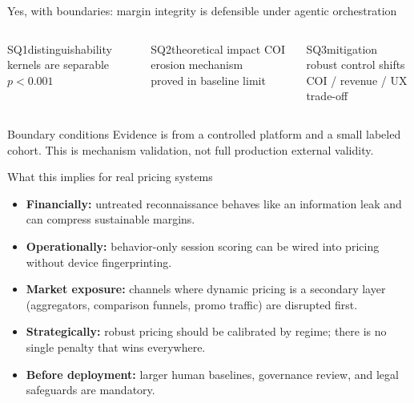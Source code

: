 \documentclass[aspectratio=169,11pt]{beamer}
\begin{document}
\begin{frame}{Yes, with boundaries: margin integrity \alert{is defensible} under agentic orchestration}
  \begin{columns}[T,onlytextwidth]
    \begin{block}{SQ1\;\;distinguishability}
      \centering
      kernels are separable\\$p<0.001$
    \end{block}
    \begin{block}{SQ2\;\;theoretical impact}
      \centering
      COI erosion mechanism\\proved in baseline limit
    \end{block}
    \begin{block}{SQ3\;\;mitigation}
      \centering
      robust control shifts\\COI / revenue / UX trade-off
    \end{block}
  \end{columns}

  \vspace{0.5em}
  \begin{alertblock}{Boundary conditions}
    Evidence is from a controlled platform and a small labeled cohort.
    This is mechanism validation, not full production external validity.
  \end{alertblock}
\end{frame}

\begin{frame}{What this implies for real pricing systems}
  \begin{itemize}\setlength{\itemsep}{0.7em}
    \item \textbf{Financially:} untreated reconnaissance behaves like an information leak and can compress sustainable margins.
    \item \textbf{Operationally:} behavior-only session scoring can be wired into pricing without device fingerprinting.
    \item \textbf{Market exposure:} channels where dynamic pricing is a secondary layer (aggregators, comparison funnels, promo traffic) are disrupted first.
    \item \textbf{Strategically:} robust pricing should be calibrated by regime; there is no single penalty that wins everywhere.
    \item \textbf{Before deployment:} larger human baselines, governance review, and legal safeguards are mandatory.
  \end{itemize}
\end{frame}
\end{document}
